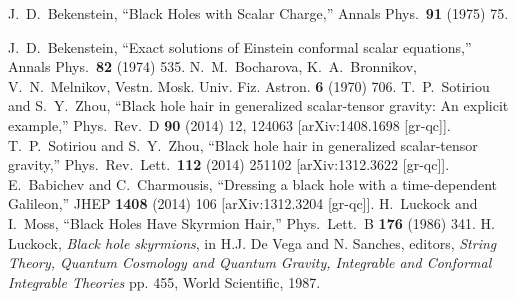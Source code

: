 \documentclass{article}
\numberwithin{equation}{section}
\begin{document}
\begin{small}
\begin{thebibliography}{99}

  J.~D.~Bekenstein,
  ``Black Holes with Scalar Charge,''
  Annals Phys.\  {\bf 91} (1975) 75.

  J.~D.~Bekenstein,
  ``Exact solutions of Einstein conformal scalar equations,''
  Annals Phys.\  {\bf 82} (1974) 535.
N.~M.~Bocharova, K.~A.~Bronnikov, V.~N.~Melnikov,
Vestn. Mosk. Univ. Fiz. Astron. {\bf 6} (1970) 706. 
  T.~P.~Sotiriou and S.~Y.~Zhou,
  ``Black hole hair in generalized scalar-tensor gravity: An explicit example,''
  Phys.\ Rev.\ D {\bf 90} (2014) 12,  124063
  [arXiv:1408.1698 [gr-qc]].
  T.~P.~Sotiriou and S.~Y.~Zhou,
  ``Black hole hair in generalized scalar-tensor gravity,''
  Phys.\ Rev.\ Lett.\  {\bf 112} (2014) 251102
  [arXiv:1312.3622 [gr-qc]].
  E.~Babichev and C.~Charmousis,
  ``Dressing a black hole with a time-dependent Galileon,''
  JHEP {\bf 1408} (2014) 106
  [arXiv:1312.3204 [gr-qc]].
  H.~Luckock and I.~Moss,
  ``Black Holes Have Skyrmion Hair,''
  Phys.\ Lett.\ B {\bf 176} (1986) 341.
H. Luckock, {\it Black hole skyrmions}, in H.J. De Vega and N. Sanches, editors,
{\it String Theory, Quantum Cosmology and Quantum Gravity, Integrable and
Conformal Integrable Theories} pp. 455, World Scientific, 1987. 


\end{thebibliography}
\end{small}
\end{document}

